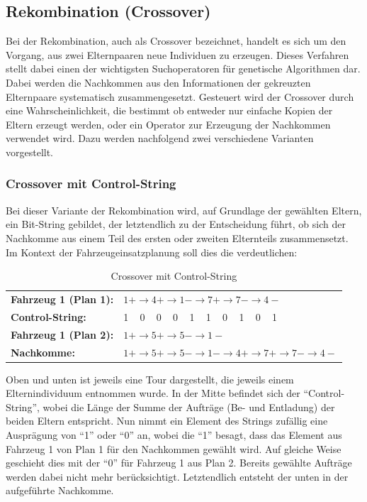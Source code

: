 \subsection{Rekombination (Crossover)}
Bei der Rekombination, auch als Crossover bezeichnet, handelt es sich um den Vorgang, aus zwei Elternpaaren neue Individuen zu erzeugen. Dieses Verfahren stellt dabei einen der wichtigsten Suchoperatoren für genetische Algorithmen dar. Dabei werden die Nachkommen aus den Informationen der gekreuzten Elternpaare systematisch zusammengesetzt. Gesteuert wird der Crossover durch eine Wahrscheinlichkeit, die bestimmt ob entweder nur einfache Kopien der Eltern erzeugt werden, oder ein Operator zur Erzeugung der Nachkommen verwendet wird. Dazu werden nachfolgend zwei verschiedene Varianten vorgestellt.

\subsubsection{Crossover mit Control-String}
Bei dieser Variante der Rekombination wird, auf Grundlage der gewählten Eltern, ein Bit-String gebildet, der letztendlich zu der Entscheidung führt, ob sich der Nachkomme aus einem Teil des ersten oder zweiten Elternteils zusammensetzt. Im Kontext der Fahrzeugeinsatzplanung soll dies die  verdeutlichen:

\begin{table}[ht!]
 \centering
 \caption{Crossover mit Control-String}
 \begin{tabular}{ll}
  \textbf{Fahrzeug 1 (Plan 1):}	& $1+ \rightarrow 4+ \rightarrow 1- \rightarrow 7+ \rightarrow 7- \rightarrow 4-$ \\
  \textbf{Control-String:} 	& 1 ~ 0 ~ 0 ~ 0 ~ 1 ~ 1 ~ 0 ~ 1 ~ 0 ~ 1 \\
  \textbf{Fahrzeug 1 (Plan 2):} 	& $1+ \rightarrow 5+ \rightarrow 5- \rightarrow 1-$ \\
  \textbf{Nachkomme:} 		& $1+ \rightarrow 5+ \rightarrow 5- \rightarrow 1- \rightarrow 4+ \rightarrow 7+ \rightarrow 7- \rightarrow 4-$
 \end{tabular}
 \label{tab:CrossoverControlString}
\end{table}

Oben und unten ist jeweils eine Tour dargestellt, die jeweils einem Elternindividuum entnommen wurde. In der Mitte befindet sich der "`Control-String"', wobei die Länge der Summe der Aufträge (Be- und Entladung) der beiden Eltern entspricht. Nun nimmt ein Element des Strings zufällig eine Ausprägung von "`1"' oder "`0"' an, wobei die "`1"' besagt, dass das Element aus Fahrzeug 1 von Plan 1 für den Nachkommen gewählt wird. Auf gleiche Weise geschieht dies mit der "`0"' für Fahrzeug 1 aus Plan 2. Bereits gewählte Aufträge werden dabei nicht mehr berücksichtigt. Letztendlich entsteht der unten in der  aufgeführte Nachkomme.


